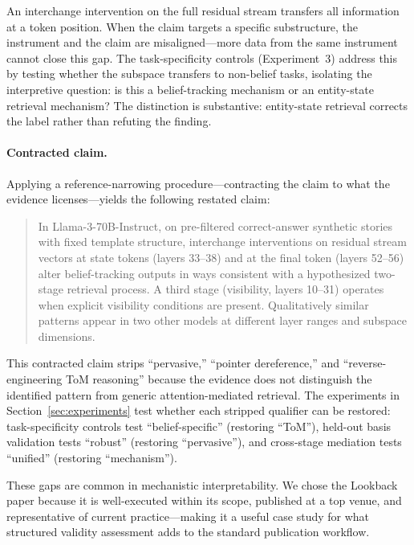\documentclass[11pt]{article}
\begin{document}
An interchange intervention on the full residual stream transfers all information at a token position. When the claim targets a specific substructure, the instrument and the claim are misaligned---more data from the same instrument cannot close this gap. The task-specificity controls (Experiment~3) address this by testing whether the subspace transfers to non-belief tasks, isolating the interpretive question: is this a belief-tracking mechanism or an entity-state retrieval mechanism? The distinction is substantive: entity-state retrieval corrects the label rather than refuting the finding.

\paragraph{Contracted claim.}
Applying a reference-narrowing procedure---contracting the claim to what the evidence licenses---yields the following restated claim:

\begin{quote}
In Llama-3-70B-Instruct, on pre-filtered correct-answer synthetic stories with fixed template structure, interchange interventions on residual stream vectors at state tokens (layers 33--38) and at the final token (layers 52--56) alter belief-tracking outputs in ways consistent with a hypothesized two-stage retrieval process. A third stage (visibility, layers 10--31) operates when explicit visibility conditions are present. Qualitatively similar patterns appear in two other models at different layer ranges and subspace dimensions.
\end{quote}

This contracted claim strips ``pervasive,'' ``pointer dereference,'' and ``reverse-engineering ToM reasoning'' because the evidence does not distinguish the identified pattern from generic attention-mediated retrieval. The experiments in Section~\ref{sec:experiments} test whether each stripped qualifier can be restored: task-specificity controls test ``belief-specific'' (restoring ``ToM''), held-out basis validation tests ``robust'' (restoring ``pervasive''), and cross-stage mediation tests ``unified'' (restoring ``mechanism'').

These gaps are common in mechanistic interpretability. We chose the Lookback paper because it is well-executed within its scope, published at a top venue, and representative of current practice---making it a useful case study for what structured validity assessment adds to the standard publication workflow.
\end{document}
